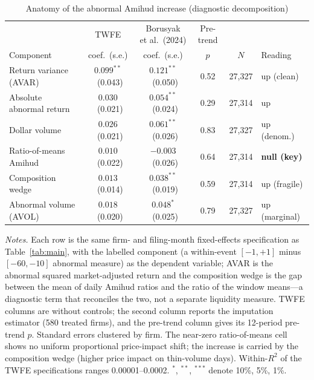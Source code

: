 \begin{table}[t]
\centering
\begin{threeparttable}
\caption{Anatomy of the abnormal Amihud increase (diagnostic decomposition)}
\label{tab:decomp}
\footnotesize
\setlength{\tabcolsep}{3pt}
\begin{tabular}{@{}lccccl@{}}
\toprule
 & TWFE & \makecell{Borusyak\\et al.\ (2024)} & Pre-trend & & \\
Component & coef.\ (s.e.) & coef.\ (s.e.) & $p$ & $N$ & Reading \\
\midrule
Return variance (AVAR)        & $0.099^{**}$\ (0.043)  & $0.121^{**}$\ (0.050)  & 0.52 & 27{,}327 & up (clean) \\
Absolute abnormal return      & $0.030$\ (0.021)       & $0.054^{**}$\ (0.024)  & 0.29 & 27{,}314 & up \\
Dollar volume                 & $0.026$\ (0.021)       & $0.061^{**}$\ (0.026)  & 0.83 & 27{,}327 & up (denom.) \\
Ratio-of-means Amihud         & $0.010$\ (0.022)       & $-0.003$\ (0.026)      & 0.64 & 27{,}314 & \textbf{null (key)} \\
Composition wedge             & $0.013$\ (0.014)       & $0.038^{**}$\ (0.019)  & 0.59 & 27{,}314 & up (fragile) \\
Abnormal volume (AVOL)        & $0.018$\ (0.020)       & $0.048^{*}$\ (0.025)   & 0.79 & 27{,}327 & up (marginal) \\
\bottomrule
\end{tabular}
\begin{tablenotes}\footnotesize
\item \textit{Notes.} Each row is the same firm- and filing-month fixed-effects specification as Table~\ref{tab:main}, with the labelled component (a within-event $[-1,+1]$ minus $[-60,-10]$ abnormal measure) as the dependent variable; AVAR is the abnormal squared market-adjusted return and the composition wedge is the gap between the mean of daily Amihud ratios and the ratio of the window means---a diagnostic term that reconciles the two, not a separate liquidity measure. TWFE columns are without controls; the second column reports the \citet{BorusyakJaravelSpiess2024} imputation estimator (580 treated firms), and the pre-trend column gives its 12-period pre-trend $p$. Standard errors clustered by firm. The near-zero ratio-of-means cell shows no uniform proportional price-impact shift; the increase is carried by the composition wedge (higher price impact on thin-volume days). Within-$R^2$ of the TWFE specifications ranges 0.00001--0.0002. $^{*}$, $^{**}$, $^{***}$ denote 10\%, 5\%, 1\%.
\end{tablenotes}
\end{threeparttable}
\end{table}
